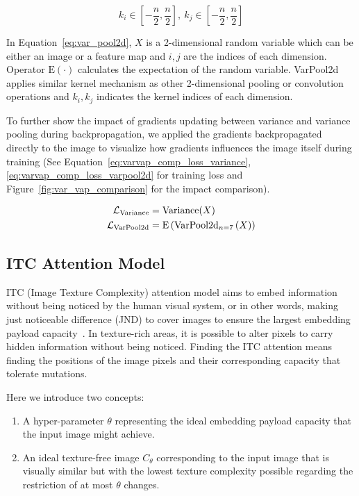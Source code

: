 \begin{equation}%
  k_i \in \left[ -\frac{n}{2}, \frac{n}{2} \right],~ k_j \in \left[ -\frac{n}{2}, \frac{n}{2} \right]
  \label{eq:var_pool2d_cond}
\end{equation}

In Equation~\ref{eq:var_pool2d}, \(X\) is a 2-dimensional random variable which can be either an image or a feature map and \(i, j\) are the indices of each dimension. Operator \(\mathrm{E}(\cdot)\) calculates the expectation of the random variable. VarPool2d applies similar kernel mechanism as other 2-dimensional pooling or convolution operations and \(k_i, k_j\) indicates the kernel indices of each dimension.

To further show the impact of gradients updating between variance and variance pooling during backpropagation, we applied the gradients backpropagated directly to the image to visualize how gradients influences the image itself during training (See Equation~\ref{eq:varvap_comp_loss_variance},\ref{eq:varvap_comp_loss_varpool2d} for training loss and Figure~\ref{fig:var_vap_comparison} for the impact comparison).

\begin{align}
    \mathcal{L}_\mathrm{Variance}  &= \mathrm{Variance}(X) \label{eq:varvap_comp_loss_variance} \\
    \mathcal{L}_\mathrm{VarPool2d} &= \mathrm{E} \left( \mathrm{VarPool2d}_{n=7} \left( X \right) \right) \label{eq:varvap_comp_loss_varpool2d}
\end{align}

\figureVarVapComparison%

\subsection{ITC Attention Model}

ITC (Image Texture Complexity) attention model aims to embed information without being noticed by the human visual system, or in other words, making just noticeable difference (JND) to cover images to ensure the largest embedding payload capacity~\cite{JND}. In texture-rich areas, it is possible to alter pixels to carry hidden information without being noticed. Finding the ITC attention means finding the positions of the image pixels and their corresponding capacity that tolerate mutations.

Here we introduce two concepts:
\begin{enumerate}
  \item A hyper-parameter \( \theta \) representing the ideal embedding payload capacity that the input image might achieve.
  \item An ideal texture-free image \(C_{\theta}\) corresponding to the input image that is visually similar but with the lowest texture complexity possible regarding the restriction of at most \( \theta \) changes.
\end{enumerate}

